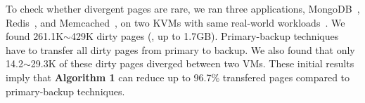 To check whether divergent pages are rare, we ran three applications, 
MongoDB~\cite{mongodb}, Redis~\cite{redis}, and Memcached~\cite{memcached}, on 
two KVMs with same real-world workloads~\cite{ycsb}. We 
found 261.1K$\sim$429K dirty pages (\ie, up to 1.7GB). Primary-backup 
techniques have to transfer all dirty pages from primary to backup. We also 
found that only 14.2$\sim$29.3K of these dirty pages diverged between two VMs. 
These initial results imply that \textbf{Algorithm 1} can reduce up to 96.7\% 
transfered pages compared to primary-backup techniques.





